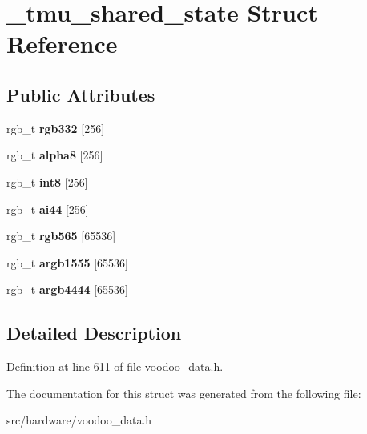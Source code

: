 \hypertarget{struct__tmu__shared__state}{\section{\-\_\-tmu\-\_\-shared\-\_\-state Struct Reference}
\label{struct__tmu__shared__state}
}
\subsection*{Public Attributes}
\begin{DoxyCompactItemize}
\item 
\hypertarget{struct__tmu__shared__state_afd23aa3522bf61a2b7647ff1544c1854}{rgb\-\_\-t {\bfseries rgb332} \mbox{[}256\mbox{]}}\label{struct__tmu__shared__state_afd23aa3522bf61a2b7647ff1544c1854}

\item 
\hypertarget{struct__tmu__shared__state_acfed5231164433d58158609af07b0843}{rgb\-\_\-t {\bfseries alpha8} \mbox{[}256\mbox{]}}\label{struct__tmu__shared__state_acfed5231164433d58158609af07b0843}

\item 
\hypertarget{struct__tmu__shared__state_ae4d7d8419af702418f8d16fef75f991a}{rgb\-\_\-t {\bfseries int8} \mbox{[}256\mbox{]}}\label{struct__tmu__shared__state_ae4d7d8419af702418f8d16fef75f991a}

\item 
\hypertarget{struct__tmu__shared__state_ac2a13a82bbb9321d4cd2876ab82bcf3e}{rgb\-\_\-t {\bfseries ai44} \mbox{[}256\mbox{]}}\label{struct__tmu__shared__state_ac2a13a82bbb9321d4cd2876ab82bcf3e}

\item 
\hypertarget{struct__tmu__shared__state_a18b14769bd0204c40df404dfe1d38a7b}{rgb\-\_\-t {\bfseries rgb565} \mbox{[}65536\mbox{]}}\label{struct__tmu__shared__state_a18b14769bd0204c40df404dfe1d38a7b}

\item 
\hypertarget{struct__tmu__shared__state_ac7b744f64de937db8c0ae36a9696cc5e}{rgb\-\_\-t {\bfseries argb1555} \mbox{[}65536\mbox{]}}\label{struct__tmu__shared__state_ac7b744f64de937db8c0ae36a9696cc5e}

\item 
\hypertarget{struct__tmu__shared__state_a6e29cc58ba3eb5d28c396a6389d53995}{rgb\-\_\-t {\bfseries argb4444} \mbox{[}65536\mbox{]}}\label{struct__tmu__shared__state_a6e29cc58ba3eb5d28c396a6389d53995}

\end{DoxyCompactItemize}


\subsection{Detailed Description}


Definition at line 611 of file voodoo\-\_\-data.\-h.



The documentation for this struct was generated from the following file\-:\begin{DoxyCompactItemize}
\item 
src/hardware/voodoo\-\_\-data.\-h\end{DoxyCompactItemize}
